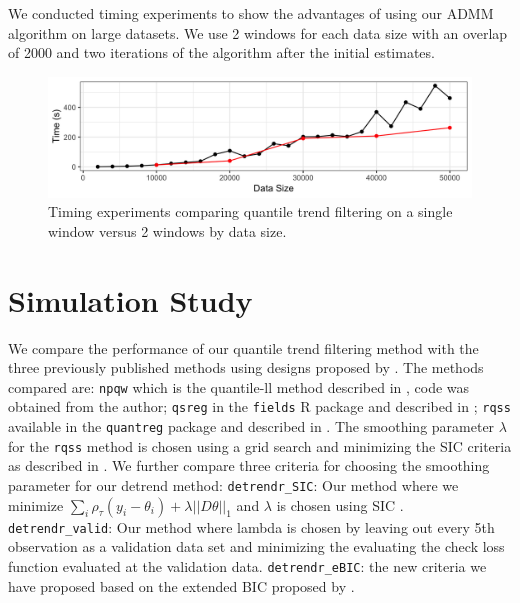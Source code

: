 \documentclass[12pt]{article}
\begin{document}
	We conducted timing experiments to show the advantages of using our ADMM algorithm on large datasets. We use 2 windows for each data size with an overlap of 2000 and two iterations of the algorithm after the initial estimates. 
	
	\begin{figure}[!h] 
		\caption{Timing experiments comparing quantile trend filtering on a single window versus 2 windows by data size.}
		\includegraphics[width = \linewidth]{Figures/Fig_timing_experiment.png}
	\end{figure}

	\section{Simulation Study}
	
	We compare the performance of our quantile trend filtering method with the three previously published methods using designs proposed by \cite{Racine2017}. The methods compared are: \texttt{npqw} which is the quantile-ll method described in \cite{Racine2017}, code was obtained from the author; \texttt{qsreg} in the \texttt{fields} R package and described in \cite{Oh2011}; \texttt{rqss} available in the \texttt{quantreg} package and described in \cite{KoenkerNgPortnoy1994}.  The smoothing parameter $\lambda$ for the \texttt{rqss} method is chosen using a grid search and minimizing the SIC criteria as described in \cite{KoenkerNgPortnoy1994}. We further compare three criteria for choosing the smoothing parameter for our detrend method: \texttt{detrendr\_SIC}: Our method where we minimize $\sum_i\rho_{\tau}(y_i - \theta_i) + \lambda||D\theta||_1$ and $\lambda$ is chosen using SIC \citep{KoenkerNgPortnoy1994}.  \texttt{detrendr\_valid}: Our method where lambda is chosen by leaving out every 5th observation as a validation data set and minimizing the evaluating the check loss function evaluated at the validation data. \texttt{detrendr\_eBIC}:  the new criteria we have proposed based on the extended BIC proposed by \cite{chen2008}. 
	 
\end{document}
